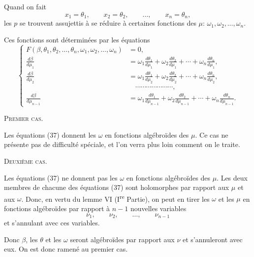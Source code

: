 \documentclass[11pt]{article}
\begin{document}
Quand on fait
\[
x_1=\theta_1,\qquad x_2=\theta_2,\qquad \ldots,\qquad x_n=\theta_n,
\]
les $p$ se trouvent assujettis à se réduire à certaines fonctions des $\mu$: $\omega_1,\omega_2,\ldots,\omega_n$.

Ces fonctions sont déterminées par les équations
\begin{equation*}\tag{37}
\left\{
\begin{aligned}
F(\beta,\theta_1,\theta_2,\ldots,\theta_n,\omega_1,\omega_2,\ldots,\omega_n)&=0,\\
\frac{d\beta}{d\mu_1}&=\omega_1\frac{d\theta_1}{d\mu_1}+\omega_2\frac{d\theta_2}{d\mu_1}+\cdots+\omega_n\frac{d\theta_n}{d\mu_1},\\
\frac{d\beta}{d\mu_2}&=\omega_1\frac{d\theta_1}{d\mu_2}+\omega_2\frac{d\theta_2}{d\mu_2}+\cdots+\omega_n\frac{d\theta_n}{d\mu_2},\\
&\hspace{1em}\cdots\cdots\cdots\cdots\cdots\cdots\cdots,\\
\frac{d\beta}{d\mu_{n-1}}&=\omega_1\frac{d\theta_1}{d\mu_{n-1}}+\omega_2\frac{d\theta_2}{d\mu_{n-1}}+\cdots+\omega_n\frac{d\theta_n}{d\mu_{n-1}}.
\end{aligned}
\right.
\end{equation*}

\begin{center}
{\scshape Premier cas.}
\end{center}

Les équations (37) donnent les $\omega$ en fonctions algébroïdes des $\mu$.
Ce cas ne présente pas de difficulté spéciale, et l’on verra plus loin comment on le traite.

\begin{center}
{\scshape Deuxième cas.}
\end{center}

Les équations (37) ne donnent pas les $\omega$ en fonctions algébroïdes des $\mu$.
Les deux membres de chacune des équations (37) sont holomorphes par rapport aux $\mu$ et aux $\omega$. Donc, en vertu du lemme VI (I\textsuperscript{re} Partie), on peut en tirer les $\omega$ et les $\mu$ en fonctions algébroïdes par rapport à $n-1$ nouvelles variables
\[
\nu_1,\qquad \nu_2,\qquad \ldots,\qquad \nu_{n-1}
\]
et s’annulant avec ces variables.

Donc $\beta$, les $\theta$ et les $\omega$ seront algébroïdes par rapport aux $\nu$ et s’annuleront avec eux. On est donc ramené au premier cas.
\end{document}
